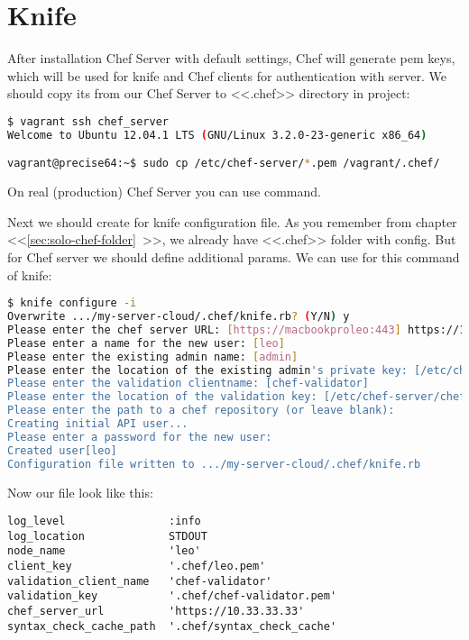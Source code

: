 \section{Knife}

After installation Chef Server with default settings, Chef will generate pem keys, which will be used for knife and Chef clients for authentication with server. We should copy its from our Chef Server to <<.chef>> directory in project:

\begin{lstlisting}[language=Bash,label=lst:my-server-cloud-knife1]
$ vagrant ssh chef_server
Welcome to Ubuntu 12.04.1 LTS (GNU/Linux 3.2.0-23-generic x86_64)

vagrant@precise64:~$ sudo cp /etc/chef-server/*.pem /vagrant/.chef/
\end{lstlisting}

On real (production) Chef Server you can use  command.

Next we should create for knife configuration file. As you remember from chapter <<\ref{sec:solo-chef-folder}~>>, we already have <<.chef>> folder with  config. But for Chef server we should define additional params. We can use for this  command of knife:

\begin{lstlisting}[language=Bash,label=lst:my-server-cloud-knife2]
$ knife configure -i
Overwrite .../my-server-cloud/.chef/knife.rb? (Y/N) y
Please enter the chef server URL: [https://macbookproleo:443] https://10.33.33.33
Please enter a name for the new user: [leo]
Please enter the existing admin name: [admin]
Please enter the location of the existing admin's private key: [/etc/chef-server/admin.pem] .chef/admin.pem
Please enter the validation clientname: [chef-validator]
Please enter the location of the validation key: [/etc/chef-server/chef-validator.pem] .chef/chef-validator.pem
Please enter the path to a chef repository (or leave blank):
Creating initial API user...
Please enter a password for the new user:
Created user[leo]
Configuration file written to .../my-server-cloud/.chef/knife.rb
\end{lstlisting}

Now our file look like this:

\begin{lstlisting}[label=lst:my-server-cloud-knife3,title=my-server-cloud/.chef/knife.rb]
log_level                :info
log_location             STDOUT
node_name                'leo'
client_key               '.chef/leo.pem'
validation_client_name   'chef-validator'
validation_key           '.chef/chef-validator.pem'
chef_server_url          'https://10.33.33.33'
syntax_check_cache_path  '.chef/syntax_check_cache'
\end{lstlisting}

